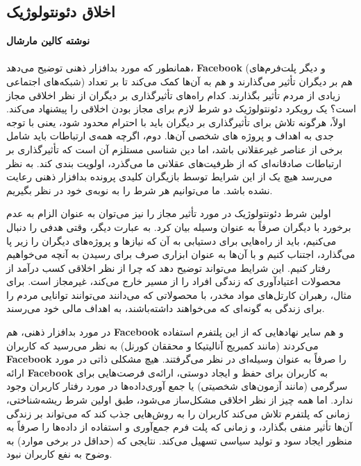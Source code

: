 {
\subsection*{اخلاق دئونتولوژیک}
\label{subsec:اخلاق دئونتولوژیک}
\noindent \textbf{نوشته کالین مارشال}
\\\\
همانطور که مورد بدافزار ذهنی توضیح می‌دهد، \textenglish{\textbf{Facebook}} (و دیگر پلت‌فرم‌های شبکه‌های اجتماعی) هم بر دیگران تأثیر می‌گذارند و هم به آن‌ها کمک می‌کند تا بر تعداد زیادی از مردم تأثیر بگذارند. کدام راه‌های تأثیرگذاری بر دیگران از نظر اخلاقی مجاز است؟ یک رویکرد دئونتولوژیک دو شرط لازم برای مجاز بودن اخلاقی را پیشنهاد می‌کند. اولاً، هرگونه تلاش برای تأثیرگذاری بر دیگران باید با احترام محدود شود، یعنی با توجه جدی به اهداف و پروژه های شخصی آن‌ها. دوم، اگرچه همه‌ی ارتباطات باید شامل برخی از عناصر غیرعقلانی باشد، اما دین شناسی مستلزم آن است که تأثیرگذاری بر ارتباطات صادقانه‌ای که از ظرفیت‌های عقلانی ما می‌گذرد، اولویت بندی کند. به نظر می‌رسد هیچ یک از این شرایط توسط بازیگران کلیدی پرونده بدافزار ذهنی رعایت نشده باشد. ما می‌توانیم هر شرط را به نوبه‌ی خود در نظر بگیریم.
}

اولین شرط دئونتولوژیک در مورد تأثیر مجاز را نیز می‌توان به عنوان الزام به عدم برخورد با دیگران صرفاً به عنوان وسیله بیان کرد.
به عبارت دیگر، وقتی هدفی را دنبال می‌کنیم، باید از راه‌هایی برای دستیابی به آن که نیازها و پروژه‌های دیگران را زیر پا می‌گذارد، اجتناب کنیم و با آن‌ها به عنوان ابزاری صرف برای رسیدن به آنچه می‌خواهیم رفتار کنیم.
این شرایط می‌تواند توضیح دهد که چرا از نظر اخلاقی کسب درآمد از محصولات اعتیادآوری که زندگی افراد را از مسیر خارج می‌کند، غیرمجاز است.
برای مثال، رهبران کارتل‌های مواد مخدر، با محصولاتی که می‌دانند می‌توانند توانایی مردم را برای زندگی به گونه‌ای که می‌خواهند داشته‌باشند، به اهداف مالی خود می‌رسند.

در مورد بدافزار ذهنی، هم \textenglish{\textbf{Facebook}} و هم سایر نهادهایی که از این پلتفرم استفاده می‌کردند (مانند کمبریج آنالیتیکا و محققان کورنل) به نظر می‌رسید که کاربران \textenglish{\textbf{Facebook}} را صرفاً به عنوان وسیله‌ای در نظر می‌گرفتند.
هیچ مشکلی ذاتی در مورد ارائه \textenglish{\textbf{Facebook}} به کاربران برای حفظ و ایجاد دوستی، ارائه‌ی فرصت‌هایی برای سرگرمی (مانند آزمون‌های شخصیتی) یا جمع آوری‌داده‌ها در مورد رفتار کاربران وجود ندارد.
اما همه چیز از نظر اخلاقی مشکل‌ساز می‌شود، طبق اولین شرط ریشه‌شناختی، زمانی که پلتفرم تلاش می‌کند کاربران را به روش‌هایی جذب کند که می‌تواند بر زندگی آن‌ها تأثیر منفی بگذارد، و زمانی که پلت فرم جمع‌آوری و استفاده از داده‌ها را صرفاً به منظور ایجاد سود و تولید سیاسی تسهیل می‌کند.
نتایجی که (حداقل در برخی موارد) به وضوح به نفع کاربران نبود.

